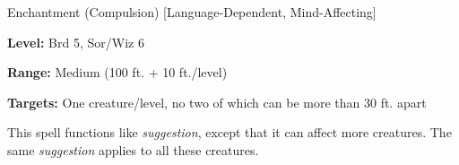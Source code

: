 \label{spell:Mass Suggestion}

Enchantment (Compulsion) [Language-Dependent, Mind-Affecting]

\textbf{Level:} Brd 5, Sor/Wiz 6

\textbf{Range:} Medium (100 ft. + 10 ft./level)

\textbf{Targets:} One creature/level, no two of which can be more than 30 ft. apart

This spell functions like \textit{suggestion}, except that it can affect more creatures. 
The same \textit{suggestion} applies to all these creatures.


